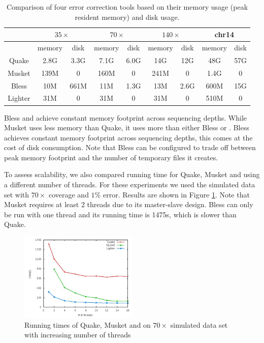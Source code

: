 \documentclass[10pt]{article}
\begin{document}
\begin{table}
\centering
\begin{tabular}{|c|c|c||c|c||c|c||c|c|} \hline
		& \multicolumn{2}{|c||}{$35\times$} & \multicolumn{2}{|c||}{$70\times$}  & \multicolumn{2}{|c||}{$140\times$} & \multicolumn{2}{|c|}{chr14}  \\ \hline
		& memory & disk & memory & disk & memory & disk & memory & disk \\ \hline
Quake   & 2.8G	& 3.3G & 7.1G & 6.0G & 14G & 12G & 48G & 57G \\ \hline		
Musket	& 139M	& 0 & 160M & 0 & 241M & 0 & 1.4G & 0 \\ \hline
Bless	& 10M	& 661M & 11M & 1.3G & 13M & 2.6G & 600M & 15G \\ \hline
Lighter	& 31M	& 0 & 31M & 0 & 31M & 0 & 510M & 0 \\ \hline
\end{tabular}
\caption{Comparison of four error correction tools based on their memory usage (peak resident memory) and disk usage.\label{table:chr14_assembly}}
\end{table}

Bless and \tool achieve constant memory footprint across sequencing depths.  While Musket uses less memory than Quake, it uses more than either Bless or \tool.  Bless achieves constant memory footprint across sequencing depths, this comes at the cost of disk consumption.  Note that Bless can be configured to trade off between peak memory footprint and the number of temporary files it creates.

To assess scalability, we also compared running time for Quake, Musket and \tool using a different number of threads.  For these experiments we used the simulated \ecoli data set with $70\times$ coverage and $1\%$ error.  Results are shown in Figure \ref{fig:runtime}.  Note that Musket requires at least 2 threads due to its master-slave design.  Bless can only be run with one thread and its running time is 1475s, which is slower than Quake.

\begin{figure}[h!]
\begin{center}
\includegraphics[width=0.5\textwidth]{runtime.jpg}
\end{center}
\caption{Running times of Quake, Musket and \tool on $70\times$ simulated data set with increasing number of threads\label{fig:runtime}}
\end{figure}
\end{document}
